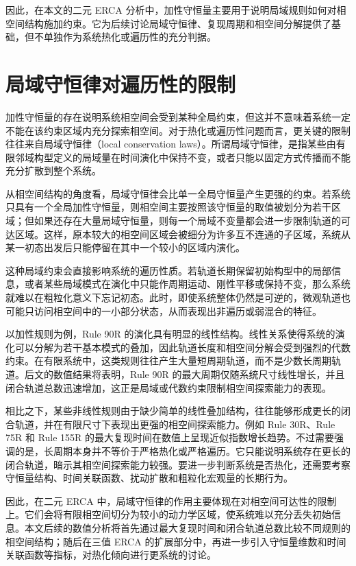 \documentclass[reprint, amsmath, amssymb, aps, physrev,prb]{revtex4-2}
\begin{document}
因此，在本文的二元 ERCA 分析中，加性守恒量主要用于说明局域规则如何对相空间结构施加约束。它为后续讨论局域守恒律、复现周期和相空间分解提供了基础，但不单独作为系统热化或遍历性的充分判据。



\section{局域守恒律对遍历性的限制}

加性守恒量的存在说明系统相空间会受到某种全局约束，但这并不意味着系统一定不能在该约束区域内充分探索相空间。对于热化或遍历性问题而言，更关键的限制往往来自局域守恒律（local conservation laws）。所谓局域守恒律，是指某些由有限邻域构型定义的局域量在时间演化中保持不变，或者只能以固定方式传播而不能充分扩散到整个系统。

从相空间结构的角度看，局域守恒律会比单一全局守恒量产生更强的约束。若系统只具有一个全局加性守恒量，则相空间主要按照该守恒量的取值被划分为若干区域；但如果还存在大量局域守恒量，则每一个局域不变量都会进一步限制轨道的可达区域。这样，原本较大的相空间区域会被细分为许多互不连通的子区域，系统从某一初态出发后只能停留在其中一个较小的区域内演化。

这种局域约束会直接影响系统的遍历性质。若轨道长期保留初始构型中的局部信息，或者某些局域模式在演化中只能作周期运动、刚性平移或保持不变，那么系统就难以在粗粒化意义下忘记初态。此时，即使系统整体仍然是可逆的，微观轨道也可能只访问相空间中的一小部分状态，从而表现出非遍历或弱混合的特征。

以加性规则为例，Rule 90R 的演化具有明显的线性结构。线性关系使得系统的演化可以分解为若干基本模式的叠加，因此轨道长度和相空间分解会受到强烈的代数约束。在有限系统中，这类规则往往产生大量短周期轨道，而不是少数长周期轨道。后文的数值结果将表明，Rule 90R 的最大周期仅随系统尺寸线性增长，并且闭合轨道总数迅速增加，这正是局域或代数约束限制相空间探索能力的表现。

相比之下，某些非线性规则由于缺少简单的线性叠加结构，往往能够形成更长的闭合轨道，并在有限尺寸下表现出更强的相空间探索能力。例如 Rule 30R、Rule 75R 和 Rule 155R 的最大复现时间在数值上呈现近似指数增长趋势。不过需要强调的是，长周期本身并不等价于严格热化或严格遍历。它只能说明系统存在更长的闭合轨道，暗示其相空间探索能力较强。要进一步判断系统是否热化，还需要考察守恒量结构、时间关联函数、扰动扩散和粗粒化宏观量的长期行为。

因此，在二元 ERCA 中，局域守恒律的作用主要体现在对相空间可达性的限制上。它们会将有限相空间切分为较小的动力学区域，使系统难以充分丢失初始信息。本文后续的数值分析将首先通过最大复现时间和闭合轨道总数比较不同规则的相空间结构；随后在三值 ERCA 的扩展部分中，再进一步引入守恒量维数和时间关联函数等指标，对热化倾向进行更系统的讨论。
\end{document}
